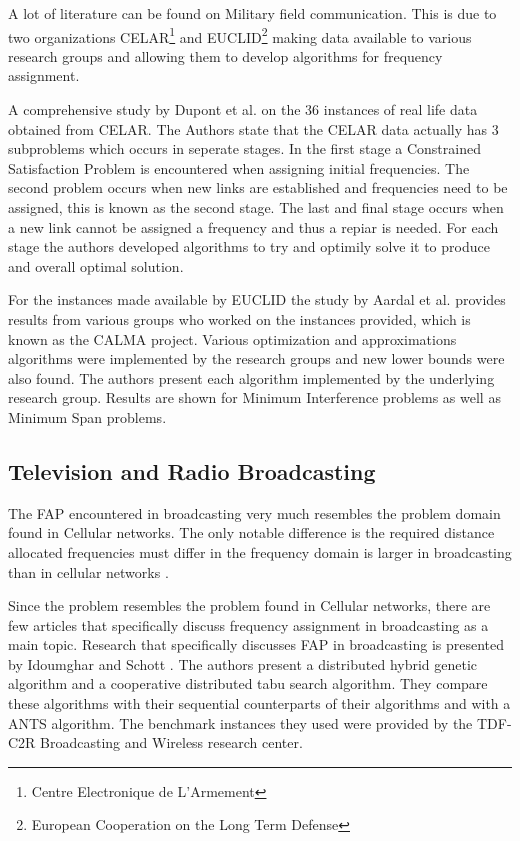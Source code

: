 A lot of literature can be found on Military field communication. This is due to two organizations CELAR\footnote{Centre Electronique de L'Armement} and EUCLID\footnote{European Cooperation on the Long Term Defense} making data available to various research groups and allowing them to develop algorithms for frequency assignment. 

A comprehensive study by Dupont et al.\cite{DynamicFAP} on the 36 instances of real life data obtained from CELAR. The Authors state that the CELAR data actually has 3 subproblems which occurs in seperate stages. In the first stage a Constrained Satisfaction Problem is encountered when assigning initial frequencies. The second problem occurs when new links are established and frequencies need to be assigned, this is known as the second stage. The last and final stage occurs when a new link cannot be assigned a frequency and thus a repiar is needed. For each stage the authors developed algorithms to try and optimily solve it to produce and overall optimal solution.

For the instances made available by EUCLID the study by Aardal et al.\cite{CALMA} provides results from various groups who worked on the instances provided, which is known as the CALMA project. Various optimization and approximations algorithms were implemented by the research groups and new lower bounds were also found. The authors present each algorithm implemented by the underlying research group. Results are shown for Minimum Interference problems as well as Minimum Span problems.
\subsection{Television and Radio Broadcasting}
The FAP encountered in broadcasting very much resembles the problem domain found in Cellular networks. The only notable difference is the required distance allocated frequencies must differ in the frequency domain is larger in broadcasting than in cellular networks \cite{Karen2004}.

Since the problem resembles the problem found in Cellular networks, there are few articles that specifically discuss frequency assignment in broadcasting as a main topic. Research that specifically discusses FAP in broadcasting is presented by Idoumghar and Schott \cite{RadioFAP}. The authors present a distributed hybrid genetic algorithm and a cooperative distributed tabu search algorithm. They compare these algorithms with their sequential counterparts of their algorithms and with a ANTS algorithm. The benchmark instances they used were provided by the TDF-C2R Broadcasting and Wireless research center.
